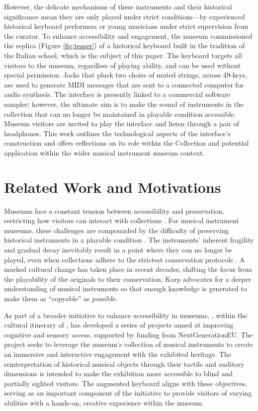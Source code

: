 However, the delicate mechanisms of these instruments and their historical
significance mean they are only played under strict conditions—by experienced
historical keyboard performers or young musicians under strict supervision from
the curator. To enhance accessibility and engagement, the museum commissioned
the replica (Figure \ref{fig:teaser}) of a historical keyboard built in the
tradition of the Italian school, which is the subject of this paper.
The keyboard targets all visitors to the museum, regardless of playing ability,
and can be used without special permission. Jacks that pluck two choirs of muted
strings, across 49-keys, are used to generate MIDI messages that are sent to a
connected computer for audio synthesis. The interface is presently linked to a
commercial software sampler; however, the ultimate aim is to make the sound of
instruments in the collection that can no longer be maintained in playable
condition accessible. Museum visitors are invited to play the interface and
listen through a pair of headphones. This work outlines the technological
aspects of the interface's construction and offers reflections on its role
within the  Collection and potential application within the
wider musical instrument museum context.

\section{Related Work and Motivations}\label{related-work}

Museums face a constant tension between accessibility and preservation,
restricting how visitors can interact with collections \cite{Templeton2018,
McAlpine2014}. For musical instrument museums, these challenges are compounded
by the difficulty of preserving historical instruments in a playable condition
\cite{McAlpine2014}. The instruments' inherent fragility and gradual decay
inevitably result in a point where they can no longer be played, even when
collections adhere to the strictest conservation protocols \cite{NYT_strad}. A
marked cultural change has taken place in recent decades, shifting the focus
from the playability of the originals to their conservation. Karp
\cite{Karp1979,Karp1985} advocates for a deeper understanding of musical
instruments so that enough knowledge is generated to make them as ``copyable''
as possible.

As part of a broader initiative to enhance accessibility in museums, , within the cultural itinerary of
, has developed a series of projects aimed at improving
cognitive and sensory access, supported by funding from NextGenerationEU. The
project seeks to leverage the museum’s collection of musical instruments to
create an immersive and interactive engagement with the exhibited heritage. The
reinterpretation of historical musical objects through their tactile and
auditory dimensions is intended to make the exhibition more accessible to blind
and partially sighted visitors. The augmented keyboard aligns with these
objectives, serving as an important component of the initiative to provide
visitors of varying abilities with a hands-on, creative experience within the
museum.

